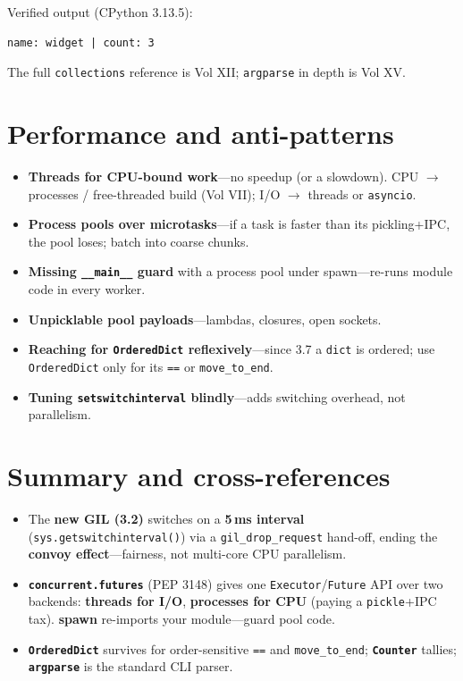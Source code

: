 Verified output (CPython 3.13.5):

\begin{lstlisting}[caption={Output}]
name: widget | count: 3
\end{lstlisting}

The full \texttt{collections} reference is Vol XII; \texttt{argparse} in depth is Vol XV.

\section{Performance and anti-patterns}

\begin{itemize}
  \item \textbf{Threads for CPU-bound work}---no speedup (or a slowdown). CPU $\rightarrow$
    processes / free-threaded build (Vol VII); I/O $\rightarrow$ threads or \texttt{asyncio}.
  \item \textbf{Process pools over microtasks}---if a task is faster than its pickling+IPC, the
    pool loses; batch into coarse chunks.
  \item \textbf{Missing \texttt{\_\_main\_\_} guard} with a process pool under spawn---re-runs
    module code in every worker.
  \item \textbf{Unpicklable pool payloads}---lambdas, closures, open sockets.
  \item \textbf{Reaching for \texttt{OrderedDict} reflexively}---since 3.7 a \texttt{dict} is
    ordered; use \texttt{OrderedDict} only for its \texttt{==} or \texttt{move\_to\_end}.
  \item \textbf{Tuning \texttt{setswitchinterval} blindly}---adds switching overhead, not
    parallelism.
\end{itemize}

\section{Summary and cross-references}

\begin{itemize}
  \item The \textbf{new GIL (3.2)} switches on a \textbf{5\,ms interval}
    (\texttt{sys.getswitchinterval()}) via a \texttt{gil\_drop\_request} hand-off, ending the
    \textbf{convoy effect}---fairness, not multi-core CPU parallelism.
  \item \textbf{\texttt{concurrent.futures}} (PEP 3148) gives one \texttt{Executor}/\texttt{Future}
    API over two backends: \textbf{threads for I/O}, \textbf{processes for CPU} (paying a
    \texttt{pickle}+IPC tax). \textbf{spawn} re-imports your module---guard pool code.
  \item \textbf{\texttt{OrderedDict}} survives for order-sensitive \texttt{==} and
    \texttt{move\_to\_end}; \textbf{\texttt{Counter}} tallies; \textbf{\texttt{argparse}} is the
    standard CLI parser.
\end{itemize}

